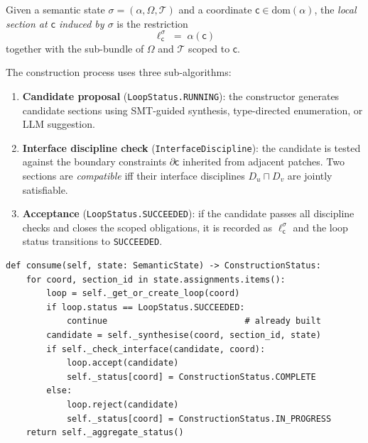 \documentclass[11pt]{article}
\newcommand{\state}{\sigma}                   %
\newcommand{\LocalSec}{\ell}                  %
\renewcommand{\coord}{\mathsf{c}}               %
\begin{document}
\begin{definition}\label{def:locsec}
Given a semantic state $\state = (\alpha, \Omega, \mathcal{T})$ and a
coordinate $\coord \in \mathrm{dom}(\alpha)$, the \emph{local section
at $\coord$ induced by $\state$} is the restriction
\[
  \LocalSec_{\coord}^{\state} \;=\; \alpha(\coord)
\]
together with the sub-bundle of $\Omega$ and $\mathcal{T}$ scoped to
$\coord$.
\end{definition}

The construction process uses three sub-algorithms:

\begin{enumerate}
  \item \textbf{Candidate proposal} (\texttt{LoopStatus.RUNNING}):
    the constructor generates candidate sections using SMT-guided
    synthesis, type-directed enumeration, or LLM suggestion.

  \item \textbf{Interface discipline check}
    (\texttt{InterfaceDiscipline}): the candidate is tested against the
    boundary constraints $\partial\coord$ inherited from adjacent
    patches.  Two sections are \emph{compatible} iff their interface
    disciplines $D_u \sqcap D_v$ are jointly satisfiable.

  \item \textbf{Acceptance} (\texttt{LoopStatus.SUCCEEDED}): if the
    candidate passes all discipline checks and closes the scoped
    obligations, it is recorded as $\LocalSec_{\coord}^{\state}$ and
    the loop status transitions to \texttt{SUCCEEDED}.
\end{enumerate}

\begin{lstlisting}[style=jugeo-python, caption={\texttt{LocalConstructor.consume} (simplified).}]
def consume(self, state: SemanticState) -> ConstructionStatus:
    for coord, section_id in state.assignments.items():
        loop = self._get_or_create_loop(coord)
        if loop.status == LoopStatus.SUCCEEDED:
            continue                           # already built
        candidate = self._synthesise(coord, section_id, state)
        if self._check_interface(candidate, coord):
            loop.accept(candidate)
            self._status[coord] = ConstructionStatus.COMPLETE
        else:
            loop.reject(candidate)
            self._status[coord] = ConstructionStatus.IN_PROGRESS
    return self._aggregate_status()
\end{lstlisting}
\end{document}
